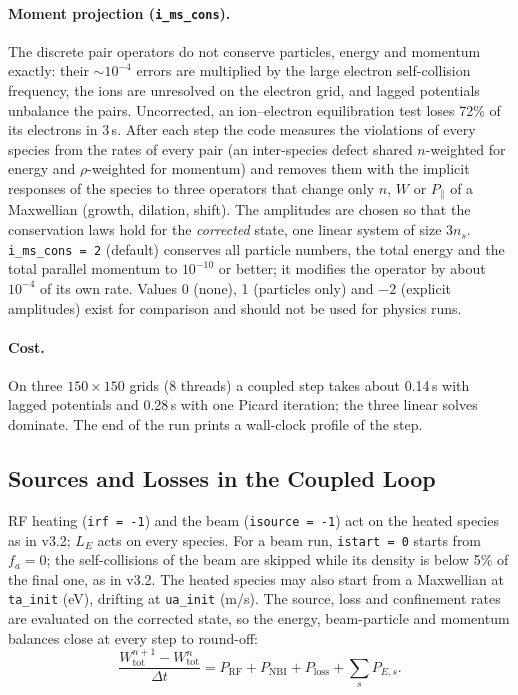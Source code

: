 \documentclass[11pt,a4paper]{article}
\begin{document}
\paragraph{Moment projection (\texttt{i\_ms\_cons}).}  The discrete pair operators do not conserve
particles, energy and momentum exactly: their $\sim10^{-4}$ errors are multiplied by the large
electron self-collision frequency, the ions are unresolved on the electron grid, and lagged
potentials unbalance the pairs.  Uncorrected, an ion--electron equilibration test loses 72\% of its
electrons in 3\,s.  After each step the code measures the violations of every species from the rates
of every pair (an inter-species defect shared $n$-weighted for energy and $\rho$-weighted for
momentum) and removes them with the implicit responses of the species to three operators that
change only $n$, $W$ or $P_\parallel$ of a Maxwellian (growth, dilation, shift).  The amplitudes are
chosen so that the conservation laws hold for the \emph{corrected} state, one linear system of size
$3n_s$.  \texttt{i\_ms\_cons = 2} (default) conserves all particle numbers, the total energy and the
total parallel momentum to $10^{-10}$ or better; it modifies the operator by about $10^{-4}$ of its
own rate.  Values 0 (none), 1 (particles only) and $-2$ (explicit amplitudes) exist for comparison
and should not be used for physics runs.

\paragraph{Cost.}  On three $150\times150$ grids (8 threads) a coupled step takes about 0.14\,s with
lagged potentials and 0.28\,s with one Picard iteration; the three linear solves dominate.  The
end of the run prints a wall-clock profile of the step.

\subsection{Sources and Losses in the Coupled Loop}

RF heating (\texttt{irf = -1}) and the beam (\texttt{isource = -1}) act on the heated species as in
v3.2; $L_E$ acts on every species.  For a beam run, \texttt{istart = 0} starts from $f_a=0$; the
self-collisions of the beam are skipped while its density is below 5\% of the final one, as in v3.2.
The heated species may also start from a Maxwellian at \texttt{ta\_init} (eV), drifting at
\texttt{ua\_init} (m/s).  The source, loss and confinement rates are evaluated on the corrected
state, so the energy, beam-particle and momentum balances close at every step to round-off:
\begin{equation}
\frac{W^{n+1}_\mathrm{tot}-W^n_\mathrm{tot}}{\Delta t}=P_\mathrm{RF}+P_\mathrm{NBI}+P_\mathrm{loss}+\sum_sP_{E,s}.
\end{equation}
\end{document}
